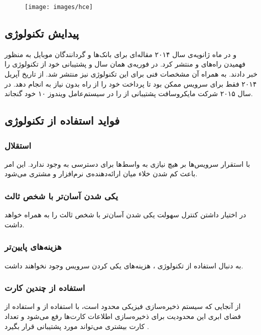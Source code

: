 \documentclass[oneside]{report}
\begin{document}
\begin{figure}[h]
	\centering
	\texttt{[image: images/hce]}
	\caption{{\footnotesize {}}}
	\label{fig:hce}
\end{figure}

\subsection{پیدایش تکنولوژی {\normalsize{}}} 
{\normalsize {}}
و 
{\normalsize {}}
در ماه ژانویه‌ی سال ۲۰۱۴ مقاله‌ای برای بانک‌ها و گردانندگان موبایل به منظور فهمیدن راه‌های
{\normalsize {}}
و 
{\normalsize {}}
منتشر کرد. در فوریه‌ی همان سال 
{\normalsize {}}
و 
{\normalsize {}}
پشتیبانی خود از تکنولوژی 
{\normalsize {}}
را خبر دادند. به همراه آن مشخصات فنی برای این تکنولوژی نیز منتشر شد.  از تاریخ آپریل ۲۰۱۴ فقط برای 
سرویس 
{\normalsize {}}
ممکن بود تا پرداخت 
{\normalsize {}}
خود را از راه 
{\normalsize {}}
بدون نیاز به 
{\normalsize {}}  
انجام دهد. در سال ۲۰۱۵ شرکت مایکروسافت پشتیبانی از 
{\normalsize {}}
را در سیستم‌عامل ویندوز ۱۰ خود گنجاند. 

\subsection{فواید استفاده از تکنولوژی {\normalsize {}}}
\subsubsection{استقلال}
		با استقرار سرویس‌ها بر 
		{\normalsize {}}
		هیچ نیازی به واسط‌ها برای دسترسی به 
		{\normalsize {}}
وجود ندارد. این امر باعث کم شدن خلاء میان ارائه‌دهنده‌ی نرم‌افزار و مشتری می‌شود. 

\subsubsection{یکی شدن آسان‌تر با شخص ثالث}					
در اختیار داشتن کنترل 
{\normalsize {}}			
	سهولت یکی شدن آسان‌تر با شخص ثالث را به همراه خواهد داشت.
\subsubsection{هزینه‌های پایین‌تر}				
	به دنبال استفاده از تکنولوژی
	{\normalsize {}}،
	هزینه‌های یکی‌ کردن سرویس 
	{\normalsize {}}
	وجود نخواهند داشت. 		
					
\subsubsection{استفاده از چندین کارت}
					از آنجایی که سیستم ذخیره‌سازی فیزیکی 
					{\normalsize {}}
					محدود است، با استفاده از 
					{\normalsize {}}
		و استفاده از فضای ابری این محدودیت برای ذخیره‌سازی اطلاعات کارت‌ها رفع می‌شود و تعداد کارت بیشتری می‌تواند مورد پشتیبانی قرار بگیرد
	\cite{hcese}			.
\end{document}
